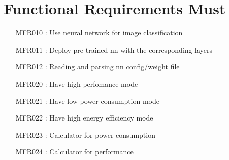 \documentclass[parskip=full]{scrartcl}
\begin{document}
\section{Functional Requirements Must}
\begin{itemize}[nosep]
\item [MFR010]: Use neural network for image classification
\item [MFR011]: Deploy pre-trained nn with the corresponding layers
\item [MFR012]: Reading and parsing nn config/weight file
\item [MFR020]: Have high perfomance mode
\item [MFR021]: Have low power consumption mode
\item [MFR022]: Have high energy efficiency mode
\item [MFR023]: Calculator for power consumption
\item [MFR024]: Calculator for performance
\end{itemize}
\end{document}
